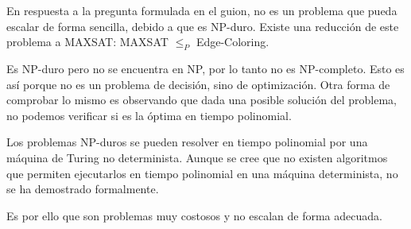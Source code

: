 \documentclass[12pt]{article} %
\begin{document}
En respuesta a la pregunta formulada en el guion, no es un problema que pueda escalar de forma sencilla, debido a que es NP-duro. Existe una reducción de este problema a MAXSAT: MAXSAT $\leq_P$ Edge-Coloring.

Es NP-duro pero no se encuentra en NP, por lo tanto no es NP-completo. Esto es así porque no es un problema de decisión, sino de optimización. Otra forma de comprobar lo mismo es observando que dada una posible solución del problema, no podemos verificar si es la óptima en tiempo polinomial.

Los problemas NP-duros se pueden resolver en tiempo polinomial por una máquina de Turing no determinista. Aunque se cree que no existen algoritmos que permiten ejecutarlos en tiempo polinomial en una máquina determinista, no se ha demostrado formalmente.

Es por ello que son problemas muy costosos y no escalan de forma adecuada.
\end{document}
